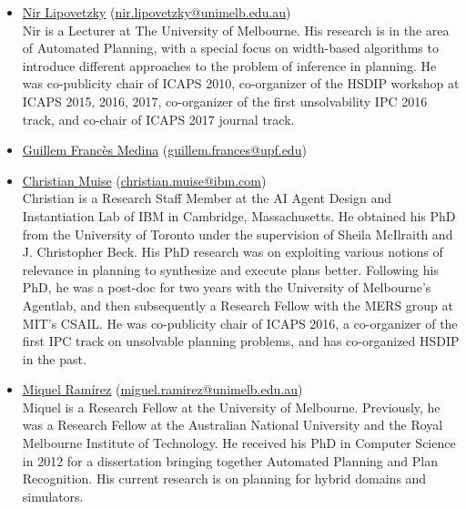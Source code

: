 \documentclass[10pt]{article}
\begin{document}
\begin{itemize}
\item \href{http://people.eng.unimelb.edu.au/nlipovetzky/}{Nir Lipovetzky}
  (\href{mailto:nir.lipovetzky@unimelb.edu.au}{nir.lipovetzky@unimelb.edu.au})\\
Nir is a Lecturer at The University of Melbourne. 
His research is in the area of Automated Planning, with a special focus on width-based algorithms
to introduce different approaches to the problem of inference in planning. He was co-publicity chair of ICAPS 2010, co-organizer
of the HSDIP workshop at ICAPS 2015, 2016, 2017, co-organizer of the first unsolvability IPC 2016 track, and co-chair of ICAPS 2017 journal track.

\item \href{http://}{Guillem Francès Medina}
  (\href{mailto:guillem.frances@upf.edu}{guillem.frances@upf.edu})\\


\item \href{http://www.haz.ca/}{Christian Muise}
 (\href{mailto:christian.muise@ibm.com}{christian.muise@ibm.com})\\
Christian is a Research Staff Member at the AI Agent Design and Instantiation Lab of IBM
in Cambridge, Massachusetts. He obtained his PhD from the University of Toronto under the
supervision of Sheila McIlraith and J. Christopher Beck. His PhD research was on exploiting
various notions of relevance in planning to synthesize and execute plans better. Following
his PhD, he was a post-doc for two years with the University of Melbourne's Agentlab, and
then subsequently a Research Fellow with the MERS group at MIT's CSAIL. He was co-publicity
chair of ICAPS 2016, a co-organizer of the first IPC track on unsolvable planning problems,
and has co-organized HSDIP in the past.


%
\item \href{http://findanexpert.unimelb.edu.au/display/person778610#tab-overview}{Miquel Ram\'{i}rez}
  (\href{mailto:miguel.ramirez@unimelb.edu.au}{miguel.ramirez@unimelb.edu.au})\\
Miquel is a Research Fellow at the University of Melbourne. Previously, he was
a Research Fellow at the Australian National University and the Royal Melbourne
Institute of Technology. He
received his PhD in Computer Science in 2012 for a dissertation
bringing together Automated Planning and Plan Recognition. His current
research is on planning for hybrid domains and simulators.



\end{itemize}
\end{document}
